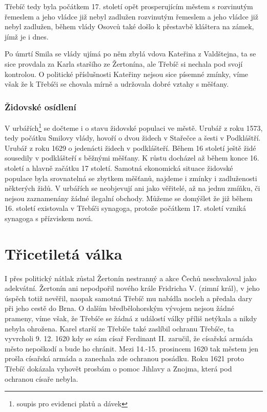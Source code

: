\documentclass[a4paper,oneside,12p]{report}
\begin{document}
Třebíč tedy byla počátkem 17. století opět prosperujícím městem s rozvinutým řemeslem a jeho vládce již nebyl zadlužen rozvinutým řemeslem a jeho vládce již nebyl zadlužen, během vlády Osovců také došlo k přestavbě kláštera na zámek, jímž je i dnes. %

Po úmrtí Smila se vlády ujímá po něm zbylá vdova Kateřina z Valdštejna, ta se sice provdala za Karla staršího ze Žertonína, ale Třebíč si nechala pod svojí kontrolou.
O politické příslušnosti Kateřiny nejsou sice písemné zmínky, víme však že k Třebíči se chovala mírně a udržovala dobré vztahy s měšťany.

\subsubsection{Židovské osídlení}

V urbářích\footnote{soupis pro evidenci platů a dávek} se dočteme i o stavu židovské populaci ve městě.
Urubář z roku 1573, tedy počátku Smilovy vlády, hovoří o dvou židech v Stařečce a šesti v Podkláštří.
Urubář z roku 1629 o jedenácti židech v podklášteří.
Během 16 století ještě židé sousedily v podklášteří s běžnými měšťany.
K růstu docházel až během konce 16. století a hlavně začátku 17 století.
Samotná ekonomická situace židovské populace byla srovnatelná se zbytkem měšťanů, najdeme i zmínky i zadluženosti některých židů.
V urbářích se neobjevují ani jako věřitelé, až na jednu zmíňku, či nejsou zaznamenány žádné ilegalní obchody.
Můžeme se domýšlet že již během 16. století existovala v Třebíči synagoga, protože počátkem 17. století vzniká synagoga s přízviskem nová. %

\section{Třicetiletá válka}

I přes politický nátlak zůstal Žertonín nestranný a akce Čechů neschvaloval jako adekvátní.
Žertonín ani nepodpořil nového krále Fridricha V. (zimní král), v jeho úspěch totiž nevěřil, naopak samotná Třebíč mu nabídla nocleh a předala dary při jeho cestě do Brna.
O dalším bředbělohorským vývojem nejsou žádné prameny, víme však, že Třebíče se žádná z událostí války příliš netýkala a  nikdy nebyla ohrožena.
Karel starší ze Třebíče také zaslíbil ochranu Třebíče, ta vyvrcholi 9. 12. 1620 kdy se sám císař Ferdinant II. zaručil, že císařská armáda město nepoškodí a bude ho chránit.
Mezi 14.-15. prosincem 1620 tak městem jen prošla císařská armáda a zanechala zde ochranou posádku.
Roku 1621 proto Třebíč dokázala vyhovět prosbám o pomoc Jihlavy a Znojma, která pod ochranou císaře nebyla.
\end{document}
